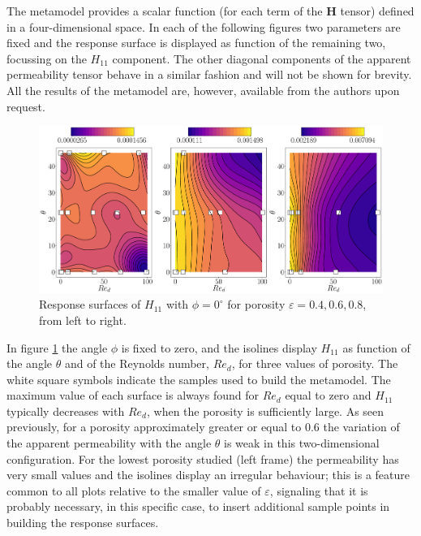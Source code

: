 The metamodel provides a scalar function (for each term of the $\mathbf{H}$ tensor) defined in a four-dimensional space.
In each of the following figures  two parameters are fixed and the response surface is displayed as function of the remaining two, focussing on the  $H_{11}$ component. 
The other diagonal components of the apparent permeability tensor behave in a similar fashion and will not be shown for brevity. All the results of the metamodel are,
however, available from the authors upon request.


\begin{figure}[t]
	\centering
	\includegraphics[width=1\linewidth]{chapter_4/figure/krig_mater_th_re}
	\caption{Response surfaces of $H_{11}$ with $\phi=0^{\circ}$ for porosity $\varepsilon=0.4, 0.6, 0.8$, from left to right.}
	\label{fig:th_re}
\end{figure}


In figure \ref{fig:th_re} the angle $\phi$ is fixed to zero, and the isolines display $H_{11}$ as function of the angle $\theta$ and of the 
Reynolds number, $Re_d$, for three  values of porosity.  The white square symbols indicate the  samples used to build the metamodel. The maximum value of 
each surface is always found for $Re_d$ equal to zero and  $H_{11}$  typically decreases with $Re_d$, when the porosity is sufficiently large.
As seen previously, for a porosity approximately greater or equal to 0.6 the variation of the  apparent permeability with the angle $\theta$ 
is weak in this two-dimensional configuration.
For the  lowest porosity studied (left frame)  the permeability has very small values and the isolines display an irregular behaviour; this is a feature
common to all plots relative to the smaller value of $\varepsilon$, signaling that it is probably necessary, in this specific case, to insert additional sample 
points in building the response surfaces. 




